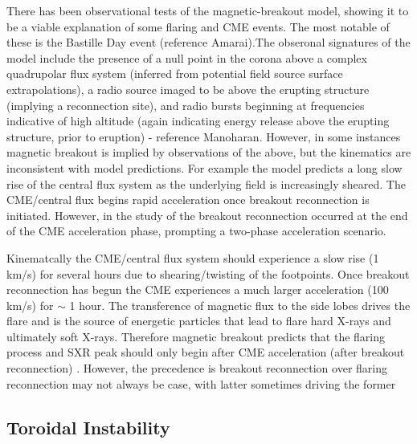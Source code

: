 There has been observational tests of the magnetic-breakout model, showing it to be a viable explanation of some flaring and CME events. The most notable of these is the Bastille Day event (reference Amarai).The obseronal signatures of the model include the presence of a null point in the corona above a complex quadrupolar flux system (inferred from potential field source surface extrapolations), a radio source imaged to be above the erupting structure (implying a reconnection site), and radio bursts beginning at frequencies indicative of high altitude (again indicating energy release above the erupting structure, prior to eruption) - reference Manoharan. However, in some instances magnetic breakout is implied by observations of the above, but the kinematics are inconsistent with model predictions. For example the model predicts a long slow rise of the central flux system as the underlying field is increasingly sheared. The CME/central flux begins rapid acceleration once breakout reconnection is initiated. However, in the study of \citet{bong2006} the breakout reconnection occurred at the end of the CME acceleration phase, prompting a two-phase acceleration scenario.

Kinematcally the CME/central flux system should experience a slow rise (1 km/s) for several hours due to shearing/twisting of the footpoints. Once breakout reconnection has begun the CME experiences a much larger acceleration (100 km/s) for $\sim$ 1 hour. The transference of magnetic flux to the side lobes drives the flare and is the source of energetic particles that lead to flare hard X-rays and ultimately soft X-rays. Therefore magnetic breakout predicts that the flaring process and SXR peak should only begin after CME acceleration (after breakout reconnection) \citep{lynch2004}. However, the precedence is breakout reconnection over flaring reconnection may not always be case, with latter sometimes driving the former \citep{macneice2004}

\subsection{Toroidal Instability}\label{sec:22}

